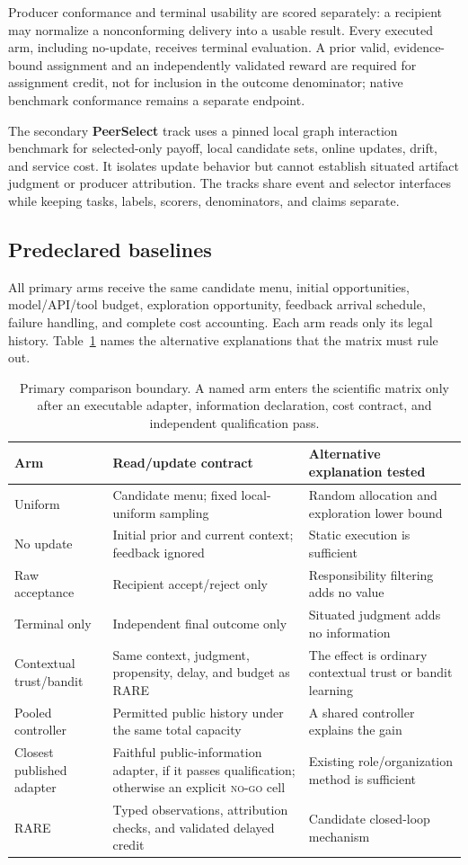 \documentclass[sigconf,anonymous]{aamas}
\begin{document}
Producer conformance and terminal usability are scored separately: a recipient may normalize a nonconforming delivery into a usable result. Every executed arm, including no-update, receives terminal evaluation. A prior valid, evidence-bound assignment and an independently validated reward are required for assignment credit, not for inclusion in the outcome denominator; native benchmark conformance remains a separate endpoint.

The secondary \textbf{PeerSelect} track uses a pinned local graph interaction benchmark for selected-only payoff, local candidate sets, online updates, drift, and service cost. It isolates update behavior but cannot establish situated artifact judgment or producer attribution. The tracks share event and selector interfaces while keeping tasks, labels, scorers, denominators, and claims separate.

\subsection{Predeclared baselines}
All primary arms receive the same candidate menu, initial opportunities, model/API/tool budget, exploration opportunity, feedback arrival schedule, failure handling, and complete cost accounting. Each arm reads only its legal history. Table~\ref{tab:baselines} names the alternative explanations that the matrix must rule out.
\begin{table}[t]
\centering\small
\begin{tabular}{p{}p{}p{}}
\toprule
Arm & Read/update contract & Alternative explanation tested\\
\midrule
Uniform & Candidate menu; fixed local-uniform sampling & Random allocation and exploration lower bound\\
No update & Initial prior and current context; feedback ignored & Static execution is sufficient\\
Raw acceptance & Recipient accept/reject only & Responsibility filtering adds no value\\
Terminal only & Independent final outcome only & Situated judgment adds no information\\
Contextual trust/bandit & Same context, judgment, propensity, delay, and budget as RARE & The effect is ordinary contextual trust or bandit learning\\
Pooled controller & Permitted public history under the same total capacity & A shared controller explains the gain\\
Closest published adapter & Faithful public-information adapter, if it passes qualification; otherwise an explicit \textsc{no-go} cell & Existing role/organization method is sufficient\\
RARE & Typed observations, attribution checks, and validated delayed credit & Candidate closed-loop mechanism\\
\bottomrule
\end{tabular}
\caption{Primary comparison boundary. A named arm enters the scientific matrix only after an executable adapter, information declaration, cost contract, and independent qualification pass.}
\label{tab:baselines}
\end{table}
\end{document}
